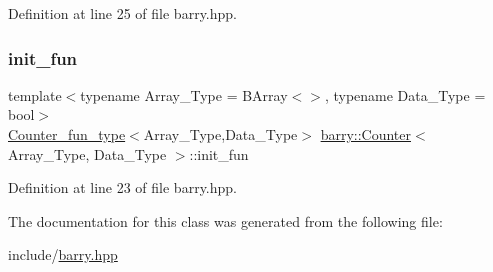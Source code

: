 Definition at line 25 of file barry.\+hpp.

\mbox{\label{classbarry_1_1_counter_a2509d75d3fc9e33d708911a38373d8ab}} 
\subsubsection{\texorpdfstring{init\+\_\+fun}{init\_fun}}
{\footnotesize\ttfamily template$<$typename Array\+\_\+\+Type  = B\+Array$<$$>$, typename Data\+\_\+\+Type  = bool$>$ \\
\hyperlink{namespacebarry_abaaae3200da8e4b7faac3c04fe9c3081}{Counter\+\_\+fun\+\_\+type}$<$Array\+\_\+\+Type,Data\+\_\+\+Type$>$ \hyperlink{classbarry_1_1_counter}{barry\+::\+Counter}$<$ Array\+\_\+\+Type, Data\+\_\+\+Type $>$\+::init\+\_\+fun}



Definition at line 23 of file barry.\+hpp.



The documentation for this class was generated from the following file\+:\begin{DoxyCompactItemize}
\item 
include/\hyperlink{barry_8hpp}{barry.\+hpp}\end{DoxyCompactItemize}
